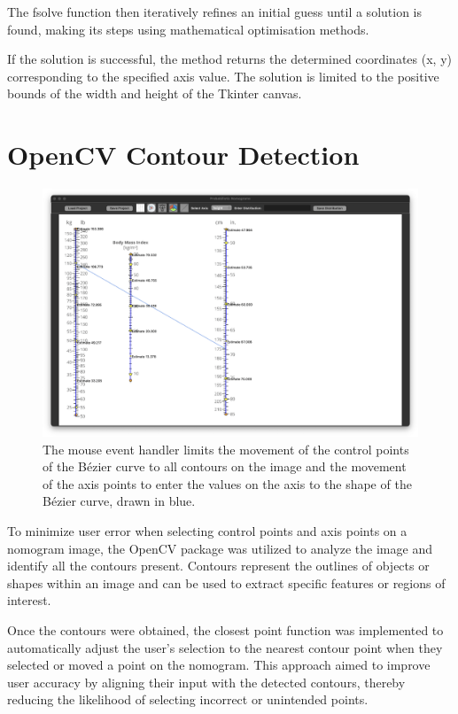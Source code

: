 \documentclass{l4proj}
\begin{document}
The fsolve function then iteratively refines an initial guess until a solution is found, making its steps using mathematical optimisation methods. \citep{virtanen_scipy_2020}

If the solution is successful, the method returns the determined coordinates (x, y) corresponding to the specified axis value. The solution is limited to the positive bounds of the width and height of the Tkinter canvas. 
\section{OpenCV Contour Detection} \label{opencv-contour}
\begin{figure}[H]
    \centering
    \includegraphics[width=\linewidth]{dissertation//images//myFigures//implementation/ss.png}
    \caption{The mouse event handler limits the movement of the control points of the Bézier curve to all contours on the image and the movement of the axis points to enter the values on the axis to the shape of the Bézier curve, drawn in blue. }
    \label{fig:complete-axis-screenshot}
\end{figure}
To minimize user error when selecting control points and axis points on a nomogram image, the OpenCV package was utilized to analyze the image and identify all the contours present. Contours represent the outlines of objects or shapes within an image and can be used to extract specific features or regions of interest.

Once the contours were obtained, the closest point function was implemented to automatically adjust the user's selection to the nearest contour point when they selected or moved a point on the nomogram. This approach aimed to improve user accuracy by aligning their input with the detected contours, thereby reducing the likelihood of selecting incorrect or unintended points.
\end{document}
